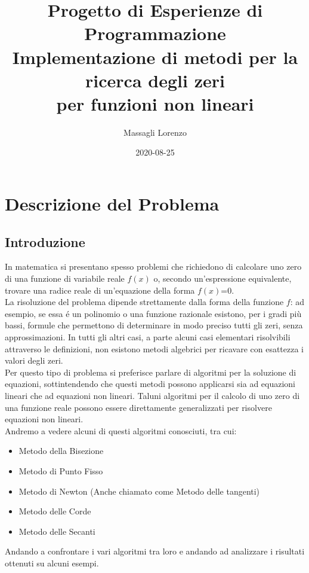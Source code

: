 \documentclass[12pt, letterpaper]{article}
\title{Progetto di Esperienze di Programmazione\\
    \large Implementazione di metodi per la ricerca degli zeri\\per funzioni non lineari}
\author{Massagli Lorenzo}
\date{2020-08-25}
\begin{document}
\maketitle
{}
\newpage
{}

\tableofcontents
\newpage

\section{Descrizione del Problema}
\subsection{Introduzione}
In matematica si presentano spesso problemi che richiedono di calcolare uno zero di una funzione di variabile reale  \( f(x) \) o, secondo un'espressione equivalente, trovare una radice reale di un'equazione della forma \( f(x) \)=0. \\
La risoluzione del problema dipende strettamente dalla forma della funzione \( f \): ad esempio, se essa \'e un polinomio o una funzione razionale esistono, per i gradi più bassi, formule che permettono di determinare in modo preciso tutti gli zeri, senza approssimazioni. 
In tutti gli altri casi, a parte alcuni casi elementari risolvibili attraverso le definizioni, non esistono metodi algebrici per ricavare con esattezza i valori degli zeri. \\
Per questo tipo di problema si preferisce parlare di algoritmi per la soluzione di equazioni, sottintendendo che questi metodi possono applicarsi sia ad equazioni lineari che ad equazioni non lineari. Taluni algoritmi per il calcolo di uno zero di una funzione reale possono essere direttamente generalizzati per risolvere equazioni non lineari. \\
Andremo a vedere alcuni di questi algoritmi conosciuti, tra cui: 
\begin{itemize}
    \item Metodo della Bisezione
    \item Metodo di Punto Fisso
    \item Metodo di Newton (Anche chiamato come Metodo delle tangenti)
    \item Metodo delle Corde
    \item Metodo delle Secanti
    
\end{itemize}
Andando a confrontare i vari algoritmi tra loro e andando ad analizzare i risultati ottenuti su alcuni esempi.
\end{document}
